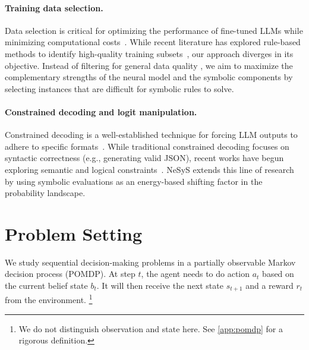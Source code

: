 \documentclass{article}
\theoremstyle{plain}
\theoremstyle{definition}
\theoremstyle{remark}
\newcommand{\ours}{{\sc NeSyS}\xspace}
\begin{document}
\paragraph{Training data selection.} Data selection is critical for optimizing the performance of fine-tuned LLMs while minimizing computational costs~\citep{zhou2023lima}. While recent literature has explored rule-based methods to identify high-quality training subsets~\citep{li2024rule}, our approach diverges in its objective. Instead of filtering for general data quality%
, we aim to maximize the complementary strengths of the neural model and the symbolic components by selecting instances that are difficult for symbolic rules to solve.

\paragraph{Constrained decoding and logit manipulation.} Constrained decoding is a well-established technique for forcing LLM outputs to adhere to specific formats~\citep{willard2023efficient,beurer2024guiding}. While traditional constrained decoding focuses on syntactic correctness (e.g., generating valid JSON), recent works have begun exploring semantic and logical constraints~\citep{wu2024self,ma2025logically}. \ours extends this line of research by using symbolic evaluations as an energy-based shifting factor in the probability landscape. %

\section{Problem Setting}\label{sec:problem}
We study sequential decision-making problems in a partially observable Markov decision process (POMDP). At step $t$, the agent needs to do action $a_t$ based on the current belief state $b_t$. It will then receive the next state $s_{t+1}$ and a reward $r_t$ from the environment.  \footnote{We do not distinguish observation and state here. See \cref{app:pomdp} for a rigorous definition.}
\end{document}
